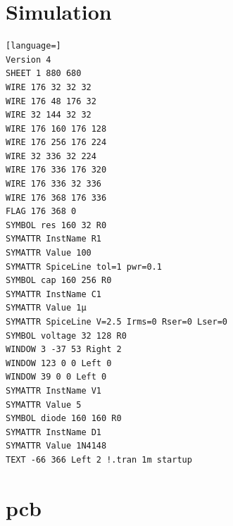 \section{Simulation}\label{apx:sim}

\begin{lstlisting}[language=]
Version 4
SHEET 1 880 680
WIRE 176 32 32 32
WIRE 176 48 176 32
WIRE 32 144 32 32
WIRE 176 160 176 128
WIRE 176 256 176 224
WIRE 32 336 32 224
WIRE 176 336 176 320
WIRE 176 336 32 336
WIRE 176 368 176 336
FLAG 176 368 0
SYMBOL res 160 32 R0
SYMATTR InstName R1
SYMATTR Value 100
SYMATTR SpiceLine tol=1 pwr=0.1
SYMBOL cap 160 256 R0
SYMATTR InstName C1
SYMATTR Value 1µ
SYMATTR SpiceLine V=2.5 Irms=0 Rser=0 Lser=0
SYMBOL voltage 32 128 R0
WINDOW 3 -37 53 Right 2
WINDOW 123 0 0 Left 0
WINDOW 39 0 0 Left 0
SYMATTR InstName V1
SYMATTR Value 5
SYMBOL diode 160 160 R0
SYMATTR InstName D1
SYMATTR Value 1N4148
TEXT -66 366 Left 2 !.tran 1m startup
\end{lstlisting}

\section{\acrshort{pcb}}\label{apx:pcb}

